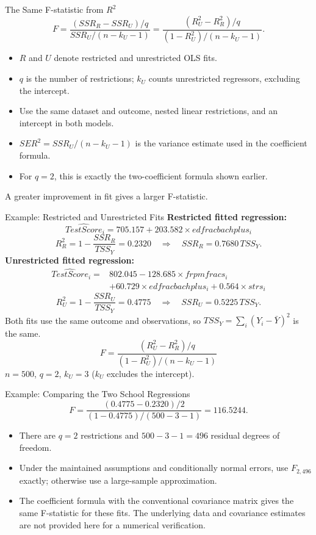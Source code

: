\documentclass[notes,10pt, aspectratio=169]{beamer}
\begin{document}
\begin{frame}{The Same F-statistic from $R^2$}
\[F=\frac{(SSR_R-SSR_U)/q}{SSR_U/(n-k_U-1)}
=\frac{(R_U^2-R_R^2)/q}{(1-R_U^2)/(n-k_U-1)}.\]
\begin{itemize}
\item $R$ and $U$ denote restricted and unrestricted OLS fits.
\item $q$ is the number of restrictions; $k_U$ counts unrestricted regressors, excluding the intercept.
\item Use the same dataset and outcome, nested linear restrictions, and an intercept in both models.
\item $SER^2=SSR_U/(n-k_U-1)$ is the variance estimate used in the coefficient formula.
\item For $q=2$, this is exactly the two-coefficient formula shown earlier.
\end{itemize}
\vspace{.5em}
A greater improvement in fit gives a larger F-statistic.
\end{frame}


\begin{frame}{Example: Restricted and Unrestricted Fits}
\small
\setlength{\abovedisplayskip}{.35em}
\setlength{\belowdisplayskip}{.35em}
\textbf{Restricted fitted regression:}
\[\widehat{TestScore}_i=705.157+203.582\times edfracbachplus_i\]
\[R_R^2=1-\frac{SSR_R}{TSS_Y}=0.2320
\quad\Rightarrow\quad SSR_R=0.7680\,TSS_Y.\]
\textbf{Unrestricted fitted regression:}
\begin{align*}
\widehat{TestScore}_i={}&802.045-128.685\times frpmfracs_i\\
&+60.729\times edfracbachplus_i+0.564\times strs_i
\end{align*}
\[R_U^2=1-\frac{SSR_U}{TSS_Y}=0.4775
\quad\Rightarrow\quad SSR_U=0.5225\,TSS_Y.\]
Both fits use the same outcome and observations, so
$TSS_Y=\sum_i(Y_i-\bar Y)^2$ is the same.
\[\boxed{F=\frac{(R_U^2-R_R^2)/q}{(1-R_U^2)/(n-k_U-1)}}\]
$n=500$, $q=2$, $k_U=3$ ($k_U$ excludes the intercept).
\end{frame}

\begin{frame}{Example: Comparing the Two School Regressions}
\[F=\frac{(0.4775-0.2320)/2}{(1-0.4775)/(500-3-1)}=116.5244.\]
\begin{itemize}
\item There are $q=2$ restrictions and $500-3-1=496$ residual degrees of freedom.\\[1em]
\item Under the maintained assumptions and conditionally normal errors, use $F_{2,496}$ exactly; otherwise use a large-sample approximation.\\[1em]
\item The coefficient formula with the conventional covariance matrix gives the same F-statistic for these fits. The underlying data and covariance estimates are not provided here for a numerical verification.
\end{itemize}
\end{frame}
\end{document}
